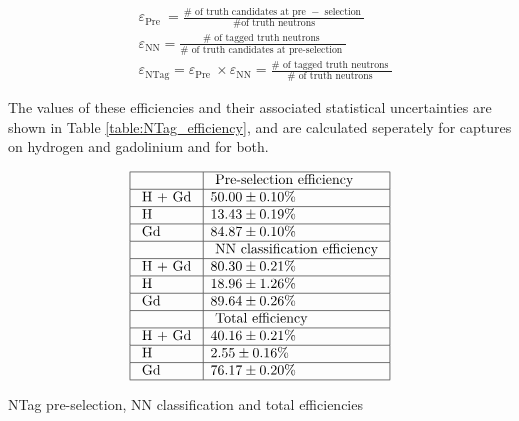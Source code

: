 \begin{equation}
\begin{aligned}
    & \varepsilon_{\text {Pre }}=\frac{\# \text { of truth candidates at pre }-\text { selection }}{\# \text{of truth neutrons}} \\
    & \varepsilon_{\mathrm{NN}}=\frac{\# \text { of tagged truth neutrons }}{\# \text { of truth candidates at pre-selection }} \\
    & \varepsilon_{\mathrm{NTag}}=\varepsilon_{\text {Pre }} \times \varepsilon_{\mathrm{NN}}=\frac{\# \text { of tagged truth neutrons }}{\# \text { of truth neutrons }}
\end{aligned}
\label{eq:efficiency_equations}
\end{equation}

The values of these efficiencies and their associated statistical uncertainties are shown in Table \ref{table:NTag_efficiency}, and are calculated seperately for captures on hydrogen and gadolinium and for both. 

\begin{table}
    $$
    \begin{array}{|l|l|}
    \hline & \text { Pre-selection efficiency } \\
    \hline \text { H + Gd } &50.00 \pm 0.10 \% \\
    \hline \text{ H } & 13.43 \pm 0.19 \% \\
    \hline \text { Gd } & 84.87 \pm 0.10 \% \\
    \hline & \text { NN classification efficiency } \\
    \hline \text { H + Gd } & 80.30 \pm 0.21 \% \\
    \hline \text { H } & 18.96 \pm 1.26 \% \\
    \hline \text { Gd } & 89.64 \pm 0.26 \% \\
    \hline & \text { Total efficiency } \\
    \hline \text { H + Gd } & 40.16 \pm 0.21 \% \\
    \hline \text { H } & 2.55 \pm 0.16 \% \\
    \hline \text { Gd } & 76.17 \pm 0.20 \% \\
    \hline
    \end{array}
    $$
    \caption{NTag pre-selection, NN classification and total efficiencies}
    \label{table:NTag_efficiency}
\end{table}

